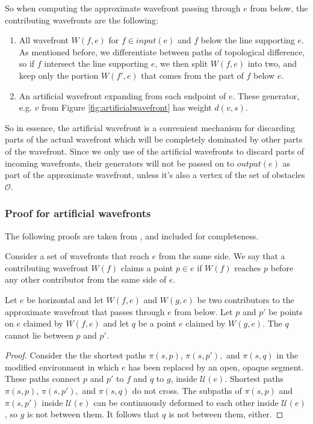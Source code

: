 So when computing the approximate wavefront passing through $e$ from below, the contributing 
wavefronts are the following:

\begin{enumerate}
\item All wavefront $W(f,e)$ for $f \in input(e)$ and $f$ below the line supporting $e$. As 
mentioned before, we differentiate between paths of topological difference, so if $f$ 
intersect the line supporting $e$, we then split $W(f,e)$ into two, and keep only the portion 
$W(f',e)$ that comes from the part of $f$ below $e$.
\item An artificial wavefront expanding from each endpoint of $e$. These generator, e.g. $v$ 
from Figure \ref{fig:artificialwavefront} has weight $d(v,s)$.
\end{enumerate}

So in essence, the artificial wavefront is a convenient mechanism for discarding parts of the 
actual wavefront which will be completely dominated by other parts of the wavefront. Since we 
only use of the artificial wavefronts to discard parts of incoming wavefronts, their generators 
will not be passed on to $output(e)$ as part of the approximate wavefront, unless it's also a 
vertex of the set of obstacles $\mathcal{O}$.

\subsubsection{Proof for artificial wavefronts}

The following proofs are taken from \cite{HershbergerS99}, and included for completeness.

Consider a set of wavefronts that reach $e$ from the same side. We say that a
contributing wavefront $W(f)$  claims a point $p \in e$ if $W(f)$ reaches $p$
before any other contributor from the same side of $e$.

\begin{Lemma} 
	Let $e$ be horizontal  and let $W(f,e)$ and $W(g,e)$ be two contributors to the
	approximate wavefront that passes through $e$ from below. Let $p$ and $p'$ be
	points on $e$ claimed by $W(f,e)$ and let $q$ be a point $e$ claimed by $W(g,e)$. The
	$q$ cannot lie between $p$ and $p'$.
\end{Lemma}

\begin{proof}
	Consider the the shortest paths $\pi(s,p)$, $\pi(s,p'),$ and $\pi(s,q)$ in
	the modified environment in which $e$ has been replaced by an open, opaque
	segment. These paths connect $p$ and $p'$ to $f$ and $q$ to $g$, inside
	$\mathcal{U}(e)$. Shortest paths $\pi(s,p)$, $\pi(s,p'),$ and $\pi(s,q)$ do
	not cross. The subpaths of $\pi(s,p)$ and $\pi(s,p')$ inside
	$\mathcal{U}(e)$ can be continuously deformed to each other inside
	$\mathcal{U}(e)$, so $g$ is not between them. It follows that $q$ is not
	between them, either.
\end{proof}

